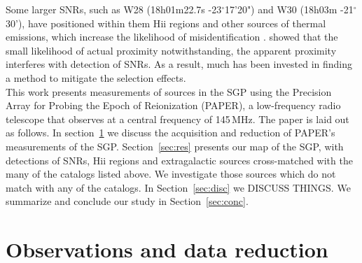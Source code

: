 \documentclass[useAMS,usenatbib]{mn2e}
\begin{document}
Some larger SNRs, such as W28 (18h01m22.7s -23$^{\circ}$17'20") and W30 (18h03m -21$^{\circ}$30'), have positioned within them H{\sc ii} regions and other sources of thermal emissions, which increase the likelihood of misidentification \citep{Andrews.85}. \cite{Brogan.06} showed that the small likelihood of actual proximity notwithstanding, the apparent proximity interferes with detection of SNRs.  As a result, much has been invested in finding a method to mitigate the selection effects.\\



This work presents measurements of sources in the SGP using the Precision Array for Probing the Epoch of Reionization (PAPER), a low-frequency radio telescope that observes at a central frequency of 145\,MHz. The paper is laid out as follows. In section~\ref{sec:obs} we discuss the acquisition and reduction of PAPER's measurements of the SGP. Section~\ref{sec:res} presents our map of the SGP, with detections of SNRs, H{\sc ii} regions and extragalactic sources cross-matched with the many of the catalogs listed above. We investigate those sources which do not match with any of the catalogs. In Section~\ref{sec:disc} we {\color{red} DISCUSS THINGS}. We summarize and conclude our study in Section~\ref{sec:conc}.

\section{Observations and data reduction}
\label{sec:obs}
\end{document}
